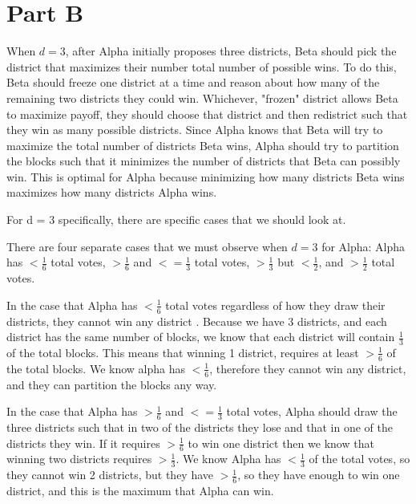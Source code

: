 \documentclass[12pt]{article}%
\begin{document}
\section*{Part B}

When $d=3$, after Alpha initially proposes three districts, Beta should pick the district that maximizes their number total number of possible wins.  To do this, Beta should freeze one district at a time and reason about how many of the remaining two districts they could win.  Whichever, "frozen" district allows Beta to maximize payoff, they should choose that district and then redistrict such that they win as many possible districts. Since Alpha knows that Beta will try to maximize the total number of districts Beta wins, Alpha should try to partition the blocks such that it minimizes the number of districts that Beta can possibly win. This is optimal for Alpha because minimizing how many districts Beta wins maximizes how many districts Alpha wins. 
\newline

For d = 3 specifically, there are specific cases that we should look at. 
\newline

  There are four separate cases that we must observe when $d=3$ for Alpha: Alpha has $<\frac{1}{6}$ total votes, $>\frac{1}{6}$ and $<=\frac{1}{3}$ total votes, $>\frac{1}{3}$ but 
  $< \frac{1}{2}$, and $>\frac{1}{2}$ total votes.
  \newline


In the case that Alpha has $<\frac{1}{6}$ total votes regardless of how they draw their districts, they cannot win any district . Because we have 3 districts, and each district has the same number of blocks, we know that each district will contain $\frac{1}{3}$ of the total blocks. This means that winning 1 district, requires at least  $> \frac{1}{6}$ of the total blocks. We know alpha has $<  \frac{1}{6}$, therefore they cannot win any district, and they can partition the blocks any way.
\newline

In the case that Alpha has $>\frac{1}{6}$ and $<=\frac{1}{3}$ total votes, Alpha should draw the three districts such that in two of the districts they lose and that in one of the districts they win.  If it requires $> \frac{1}{6}$ to win one district then we know that winning two districts requires $> \frac{1}{3}$. We know Alpha has $< \frac{1}{3}$ of the total votes, so they cannot win 2 districts, but they have $>\frac{1}{6}$, so they have enough to win one district, and this is the maximum that Alpha can win.
\newline
\end{document}
